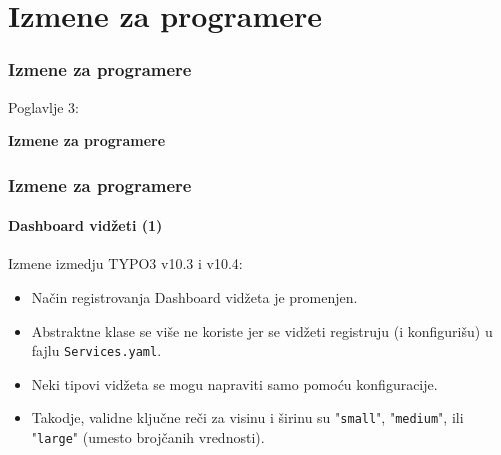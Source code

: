 %

\section{Izmene za programere}
\begin{frame}[fragile]
	\frametitle{Izmene za programere}

	\begin{center}\huge{Poglavlje 3:}\end{center}
	\begin{center}\huge{\color{typo3darkgrey}\textbf{Izmene za programere}}\end{center}

\end{frame}


\begin{frame}[fragile]
	\frametitle{Izmene za programere}
	\framesubtitle{Dashboard vidžeti (1)}

	Izmene izmedju TYPO3 v10.3 i v10.4:

	\begin{itemize}
		\item Način registrovanja Dashboard vidžeta je promenjen.
		\item Abstraktne klase se više ne koriste jer se vidžeti registruju
			(i konfigurišu) u fajlu \texttt{Services.yaml}.
		\item Neki tipovi vidžeta se mogu napraviti samo pomoću konfiguracije.
		\item Takodje, validne ključne reči za visinu i širinu su
			"\texttt{small}", "\texttt{medium}", ili "\texttt{large}"
			(umesto brojčanih vrednosti).
	\end{itemize}

\end{frame}


